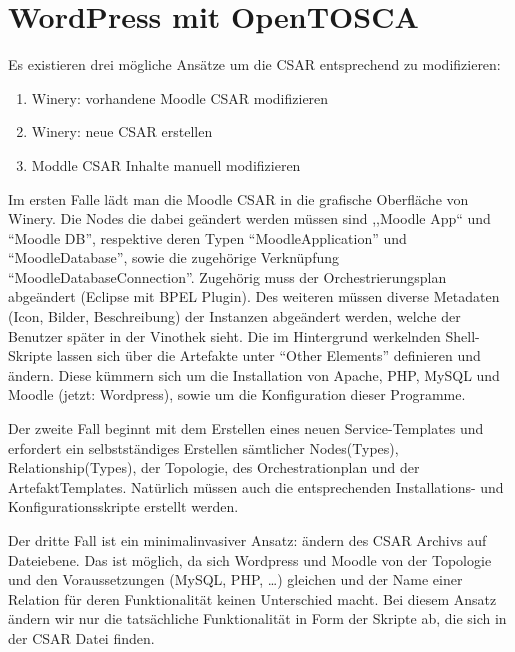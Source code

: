 \section{WordPress mit OpenTOSCA}

Es existieren drei mögliche Ansätze um die CSAR entsprechend zu modifizieren:
\begin{enumerate}
    \item Winery: vorhandene Moodle CSAR modifizieren
    \item Winery: neue CSAR erstellen
    \item Moddle CSAR Inhalte manuell modifizieren
\end{enumerate}

Im ersten Falle lädt man die Moodle CSAR in die grafische Oberfläche von Winery.
Die Nodes die dabei geändert werden müssen sind ,,Moodle App`` und \enquote{Moodle DB}, respektive deren Typen \enquote{MoodleApplication} und \enquote{MoodleDatabase}, sowie die zugehörige Verknüpfung \enquote{MoodleDatabaseConnection}.
Zugehörig muss der Orchestrierungsplan abgeändert (Eclipse mit BPEL Plugin).
Des weiteren müssen diverse Metadaten (Icon, Bilder, Beschreibung) der Instanzen abgeändert werden, welche der Benutzer später in der Vinothek sieht.
Die im Hintergrund werkelnden Shell-Skripte lassen sich über die Artefakte unter \enquote{Other Elements} definieren und ändern. Diese kümmern sich um die Installation von Apache, PHP, MySQL und Moodle (jetzt: Wordpress), sowie um die Konfiguration dieser Programme.

Der zweite Fall beginnt mit dem Erstellen eines neuen Service-Templates und erfordert ein selbstständiges Erstellen sämtlicher Nodes(Types), Relationship(Types), der Topologie, des Orchestrationplan und der ArtefaktTemplates.
Natürlich müssen auch die entsprechenden Installations- und Konfigurationsskripte erstellt werden.

Der dritte Fall ist ein minimalinvasiver Ansatz: ändern des CSAR Archivs auf Dateiebene.
Das ist möglich, da sich Wordpress und Moodle von der Topologie und den Voraussetzungen (MySQL, PHP, \ldots) gleichen und der Name einer Relation für deren Funktionalität keinen Unterschied macht.
Bei diesem Ansatz ändern wir nur die tatsächliche Funktionalität in Form der Skripte ab, die sich in der CSAR Datei finden.


